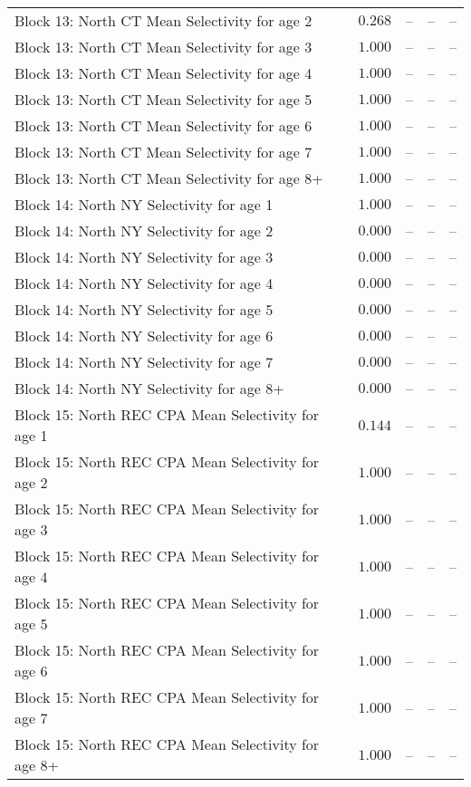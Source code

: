 \documentclass[
]{article}
\begin{document}
\begin{landscape}
\begin{longtable}[t]{lrrrr}
Block 13: North CT Mean Selectivity for age 2 & $0.268$ & -- & -- & --\\
\addlinespace
Block 13: North CT Mean Selectivity for age 3 & $1.000$ & -- & -- & --\\
Block 13: North CT Mean Selectivity for age 4 & $1.000$ & -- & -- & --\\
Block 13: North CT Mean Selectivity for age 5 & $1.000$ & -- & -- & --\\
Block 13: North CT Mean Selectivity for age 6 & $1.000$ & -- & -- & --\\
Block 13: North CT Mean Selectivity for age 7 & $1.000$ & -- & -- & --\\
\addlinespace
Block 13: North CT Mean Selectivity for age 8+ & $1.000$ & -- & -- & --\\
Block 14: North NY Selectivity for age 1 & $1.000$ & -- & -- & --\\
Block 14: North NY Selectivity for age 2 & $0.000$ & -- & -- & --\\
Block 14: North NY Selectivity for age 3 & $0.000$ & -- & -- & --\\
Block 14: North NY Selectivity for age 4 & $0.000$ & -- & -- & --\\
\addlinespace
Block 14: North NY Selectivity for age 5 & $0.000$ & -- & -- & --\\
Block 14: North NY Selectivity for age 6 & $0.000$ & -- & -- & --\\
Block 14: North NY Selectivity for age 7 & $0.000$ & -- & -- & --\\
Block 14: North NY Selectivity for age 8+ & $0.000$ & -- & -- & --\\
Block 15: North REC CPA Mean Selectivity for age 1 & $0.144$ & -- & -- & --\\
\addlinespace
Block 15: North REC CPA Mean Selectivity for age 2 & $1.000$ & -- & -- & --\\
Block 15: North REC CPA Mean Selectivity for age 3 & $1.000$ & -- & -- & --\\
Block 15: North REC CPA Mean Selectivity for age 4 & $1.000$ & -- & -- & --\\
Block 15: North REC CPA Mean Selectivity for age 5 & $1.000$ & -- & -- & --\\
Block 15: North REC CPA Mean Selectivity for age 6 & $1.000$ & -- & -- & --\\
\addlinespace
Block 15: North REC CPA Mean Selectivity for age 7 & $1.000$ & -- & -- & --\\
Block 15: North REC CPA Mean Selectivity for age 8+ & $1.000$ & -- & -- & --\\

\end{longtable}
\end{landscape}
\end{document}
